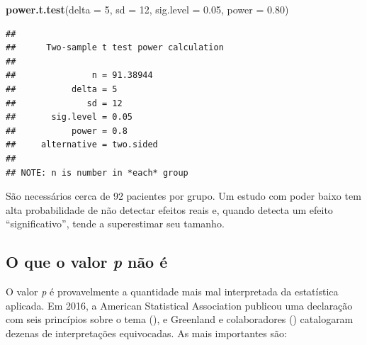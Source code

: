 \documentclass[
]{book}
\newenvironment{Shaded}{\begin{snugshade}}{\end{snugshade}}
\newcommand{\AttributeTok}[1]{\textcolor[rgb]{0.13,0.29,0.53}{#1}}
\newcommand{\DecValTok}[1]{\textcolor[rgb]{0.00,0.00,0.81}{#1}}
\newcommand{\FloatTok}[1]{\textcolor[rgb]{0.00,0.00,0.81}{#1}}
\newcommand{\FunctionTok}[1]{\textcolor[rgb]{0.13,0.29,0.53}{\textbf{#1}}}
\newcommand{\NormalTok}[1]{#1}
\begin{document}
\begin{Shaded}
\begin{Highlighting}[]
\FunctionTok{power.t.test}\NormalTok{(}\AttributeTok{delta =} \DecValTok{5}\NormalTok{, }\AttributeTok{sd =} \DecValTok{12}\NormalTok{, }\AttributeTok{sig.level =} \FloatTok{0.05}\NormalTok{, }\AttributeTok{power =} \FloatTok{0.80}\NormalTok{)}
\end{Highlighting}
\end{Shaded}

\begin{verbatim}
## 
##      Two-sample t test power calculation 
## 
##               n = 91.38944
##           delta = 5
##              sd = 12
##       sig.level = 0.05
##           power = 0.8
##     alternative = two.sided
## 
## NOTE: n is number in *each* group
\end{verbatim}

São necessários cerca de 92 pacientes por grupo. Um estudo com poder baixo tem alta probabilidade de não detectar efeitos reais e, quando detecta um efeito ``significativo'', tende a superestimar seu tamanho.

\subsection{\texorpdfstring{O que o valor \emph{p} não é}{O que o valor p não é}}\label{o-que-o-valor-p-nuxe3o-uxe9}

O valor \emph{p} é provavelmente a quantidade mais mal interpretada da estatística aplicada. Em 2016, a American Statistical Association publicou uma declaração com seis princípios sobre o tema (), e Greenland e colaboradores () catalogaram dezenas de interpretações equivocadas. As mais importantes são:
\end{document}
